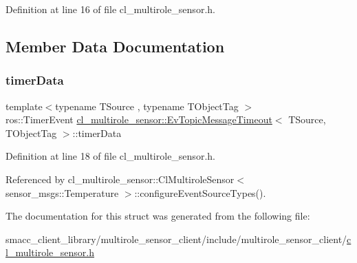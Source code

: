 Definition at line 16 of file cl\+\_\+multirole\+\_\+sensor.\+h.



\subsection{Member Data Documentation}
\mbox{\label{structcl__multirole__sensor_1_1EvTopicMessageTimeout_af4d418aeb793c180ee0becc2dec0dc34}} 
\subsubsection{\texorpdfstring{timer\+Data}{timerData}}
{\footnotesize\ttfamily template$<$typename T\+Source , typename T\+Object\+Tag $>$ \\
ros\+::\+Timer\+Event \hyperlink{structcl__multirole__sensor_1_1EvTopicMessageTimeout}{cl\+\_\+multirole\+\_\+sensor\+::\+Ev\+Topic\+Message\+Timeout}$<$ T\+Source, T\+Object\+Tag $>$\+::timer\+Data}



Definition at line 18 of file cl\+\_\+multirole\+\_\+sensor.\+h.



Referenced by cl\+\_\+multirole\+\_\+sensor\+::\+Cl\+Multirole\+Sensor$<$ sensor\+\_\+msgs\+::\+Temperature $>$\+::configure\+Event\+Source\+Types().



The documentation for this struct was generated from the following file\+:\begin{DoxyCompactItemize}
\item 
smacc\+\_\+client\+\_\+library/multirole\+\_\+sensor\+\_\+client/include/multirole\+\_\+sensor\+\_\+client/\hyperlink{cl__multirole__sensor_8h}{cl\+\_\+multirole\+\_\+sensor.\+h}\end{DoxyCompactItemize}
